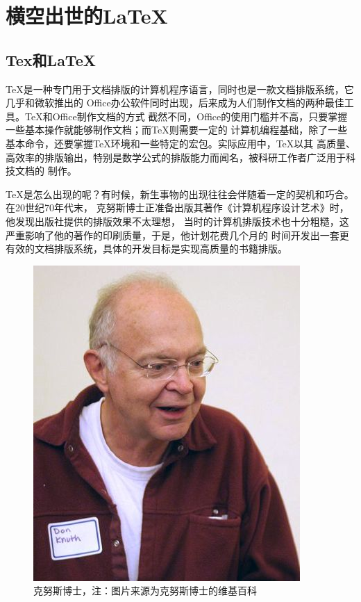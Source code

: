 \chapter{横空出世的\LaTeX }
\section{Tex和\LaTeX }
TeX是一种专门用于文档排版的计算机程序语言，同时也是一款文档排版系统，它几乎和微软推出的
Office办公软件同时出现，后来成为人们制作文档的两种最佳工具。TeX和Office制作文档的方式
截然不同，Office的使用门槛并不高，只要掌握一些基本操作就能够制作文档；而TeX则需要一定的
计算机编程基础，除了一些基本命令，还要掌握TeX环境和一些特定的宏包。实际应用中，TeX以其
高质量、高效率的排版输出，特别是数学公式的排版能力而闻名，被科研工作者广泛用于科技文档的
制作。

TeX是怎么出现的呢？有时候，新生事物的出现往往会伴随着一定的契机和巧合。在20世纪70年代末，
克努斯博士正准备出版其著作《计算机程序设计艺术》时，他发现出版社提供的排版效果不太理想，
当时的计算机排版技术也十分粗糙，这严重影响了他的著作的印刷质量，于是，他计划花费几个月的
时间开发出一套更有效的文档排版系统，具体的开发目标是实现高质量的书籍排版。

\begin{figure}
    \centering
    \includegraphics[scale=0.6]{images/Donald_Knuth.jpeg}
    \caption{克努斯博士，注：图片来源为克努斯博士的维基百科}
\end{figure}

